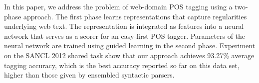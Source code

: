 In this paper, we address the problem of web-domain POS tagging using a two- phase approach. The first phase learns representations that capture regularities underlying web text. The representation is integrated as features into a neural network that serves as a scorer for an easy-first POS tagger. Parameters of the neural network are trained using guided learning in the second phase. Experiment on the SANCL 2012 shared task show that our approach achieves 93.27\% average tagging accuracy, which is the best accuracy reported so far on this data set, higher than those given by ensembled syntactic parsers.
